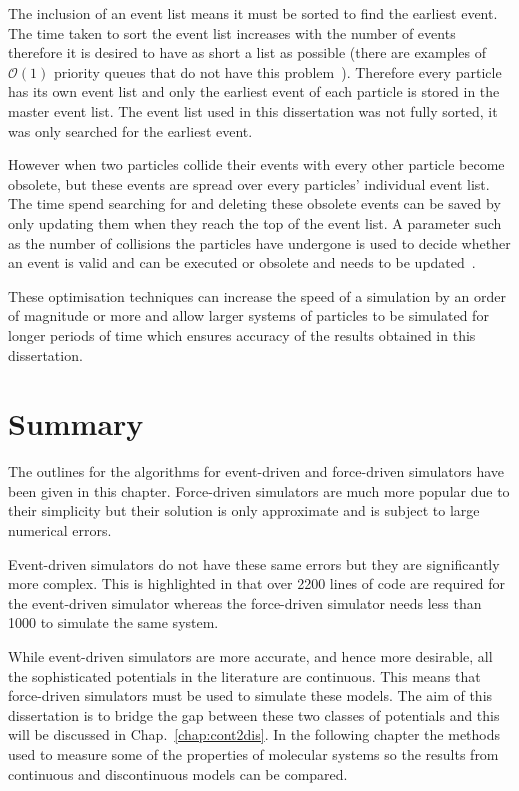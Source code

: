 \documentclass[12pt]{UoAthesis} \usepackage{booktabs}
\begin{document}
The inclusion of an event list means it must be sorted to find the
earliest event. The time taken to sort the event list increases with
the number of events therefore it is desired to have as short a list
as possible (there are examples of $\mathcal{O}(1)$ priority queues
that do not have this problem~\cite{Paul2007}).  Therefore every
particle has its own event list and only the earliest event of each
particle is stored in the master event list.  The event list used in
this dissertation was not fully sorted, it was only searched for the
earliest event.

However when two particles collide their events with every other
particle become obsolete, but these events are spread over every
particles' individual event list.  The time spend searching for and
deleting these obsolete events can be saved by only updating them when
they reach the top of the event list.  A parameter such as the number
of collisions the particles have undergone is used to decide whether
an event is valid and can be executed or obsolete and needs to be
updated~\cite{Poschel2005}.

These optimisation techniques can increase the speed of a simulation
by an order of magnitude or more and allow larger systems of particles
to be simulated for longer periods of time which ensures accuracy of
the results obtained in this dissertation.

\section{Summary}

The outlines for the algorithms for event-driven and force-driven
simulators have been given in this chapter.  Force-driven simulators
are much more popular due to their simplicity but their solution is
only approximate and is subject to large numerical errors.

Event-driven simulators do not have these same errors but they are
significantly more complex.  This is highlighted in that over 2200
lines of code are required for the event-driven simulator whereas the
force-driven simulator needs less than 1000 to simulate the same
system.

While event-driven simulators are more accurate, and hence more
desirable, all the sophisticated potentials in the literature are
continuous.  This means that force-driven simulators must be used to
simulate these models.  The aim of this dissertation is to bridge the
gap between these two classes of potentials and this will be discussed
in Chap.~\ref{chap:cont2dis}. In the following chapter the methods
used to measure some of the properties of molecular systems so the
results from continuous and discontinuous models can be compared.
\end{document}
